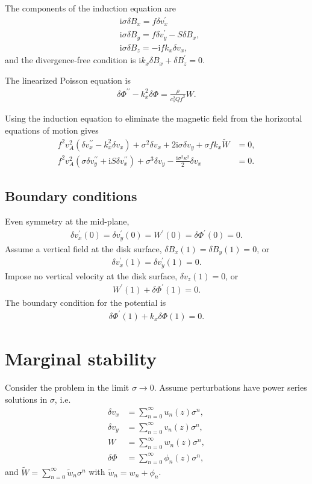 \documentclass[12pt,preprint]{aastex}
\newcommand{\imgi}{\mathrm{i}}
\newcommand{\dd}{\delta}
\newcommand{\dvx}{\dd v_x}
\newcommand{\dvy}{\dd v_y}
\newcommand{\dvz}{\dd v_z}
\newcommand{\dbx}{\dd B_x}
\newcommand{\dby}{\dd B_y}
\newcommand{\dbz}{\dd B_z}
\newcommand{\w}{ \widetilde{W}}
\newcommand{\dphi}{\dd \Phi}
\begin{document}
The components of the induction equation are 
\begin{align}
&  \imgi\sigma\dbx = f \dvx^\prime\label{induct_x}\\
&\imgi \sigma \dby = f\dvy^\prime - S\dbx, \label{induct_y}\\
& \imgi\sigma \dbz = -\imgi  f k_x \dvx, \label{induct_vert}
\end{align}    
and the divergence-free condition is $\imgi k_x\dbx +
\dbz^\prime=0$. 

The linearized Poisson equation is 
\begin{align}
  \dphi^{\prime\prime} - k_x^2\dphi =
  \frac{\rho}{c_s^2Qf^2}W.  \label{lin_poisson} 
\end{align}

Using the induction equation to eliminate the magnetic field from the
horizontal equations of motion gives
\begin{align}
f^2v_A^2\left(\dvx^{\prime\prime} - k_x^2\dvx\right) + \sigma^2\dvx +
2\imgi\sigma\dvy + \sigma f k_x \w &= 0,\label{vx_new}\\
f^2v_A^2\left(\sigma\dvy^{\prime\prime} + \imgi S
\dvx^{\prime\prime}\right) + \sigma^3\dvy - \frac{\imgi\sigma^2\kappa^2}{2}\dvx&=0.\label{vy_new}
\end{align}


\subsection{Boundary conditions}
Even symmetry at the mid-plane,
\begin{align}
  \dvx^\prime(0) = \dvy^\prime(0)=W^\prime(0) = \dphi^\prime(0) = 0.
\end{align}
Assume a vertical field at the disk surface, $\delta B_x(1) = \delta
B_y(1) = 0$, or 
\begin{align}
  \dvx^\prime(1) = \dvy^\prime(1) = 0. 
\end{align}
Impose no vertical velocity at the disk surface, $\dvz(1) = 0$, or 
\begin{align}
  W^\prime(1) + \dphi^\prime(1) = 0. 
\end{align}
The boundary condition for the potential is
\begin{align}
  \dphi^\prime (1) + k_x \dphi(1) = 0.  \label{pot_cond}
\end{align}

\section{Marginal stability} 
Consider the problem in the limit $\sigma \to 0$. Assume perturbations
have power series solutions in $\sigma$, i.e. 
\begin{align}
  \dvx &= \sum_{n=0}^\infty u_n(z)\sigma^n,\\
  \dvy &= \sum_{n=0}^\infty v_n(z)\sigma^n,\\
  W    &= \sum_{n=0}^\infty w_n(z)\sigma^n,\\
  \dphi&= \sum_{n=0}^\infty \phi_n(z)\sigma^n, 
\end{align}
and $\w = \sum_{n=0}^\infty \tilde{w}_n \sigma^n$ with $\tilde{w}_n =
w_n + \phi_n$. 
\end{document}
